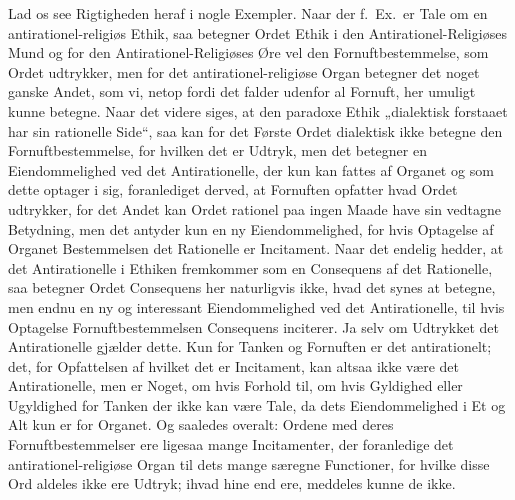 Lad os see Rigtigheden heraf i nogle Exempler. Naar der f.\ Ex.\ er Tale om en
antirationel-religiøs Ethik, saa betegner Ordet Ethik i den
Antirationel-Religiøses Mund og for den Antirationel-Religiøses Øre vel den
Fornuftbestemmelse, som Ordet udtrykker, men for det antirationel-religiøse
Organ betegner det noget ganske Andet, som vi, netop fordi det falder udenfor
al Fornuft, her umuligt kunne betegne. Naar det videre siges, at den paradoxe
Ethik „dialektisk forstaaet har sin rationelle
Side“, saa kan for det Første Ordet
dialektisk ikke betegne den Fornuftbestemmelse, for hvilken det er Udtryk, men
det betegner en Eiendommelighed ved det Antirationelle, der kun kan fattes af
Organet og som dette
optager i sig, foranlediget derved, at Fornuften opfatter hvad Ordet
udtrykker, for det Andet kan Ordet rationel paa ingen Maade have sin vedtagne
Betydning, men det antyder kun en ny Eiendommelighed, for hvis Optagelse af
Organet Bestemmelsen det Rationelle er Incitament. Naar det endelig
hedder, at det Antirationelle i Ethiken
fremkommer som en Consequens af det Rationelle, saa betegner Ordet Consequens
her naturligvis ikke, hvad det synes at betegne, men endnu en ny og interessant
Eiendommelighed ved det Antirationelle, til hvis Optagelse
Fornuftbestemmelsen Consequens inciterer. Ja selv om Udtrykket det
Antirationelle gjælder dette. Kun for Tanken og Fornuften er det antirationelt;
det, for Opfattelsen af hvilket det er Incitament, kan altsaa ikke være det
Antirationelle, men er Noget, om hvis Forhold til, om hvis Gyldighed eller
Ugyldighed for Tanken der ikke kan være Tale, da dets Eiendommelighed i Et og
Alt kun er for Organet. Og saaledes overalt: Ordene med deres
Fornuftbestemmelser ere ligesaa mange Incitamenter, der foranledige det
antirationel-religiøse Organ til dets mange særegne Functioner, for hvilke
disse Ord aldeles ikke ere Udtryk; ihvad hine end ere, meddeles kunne de ikke.

